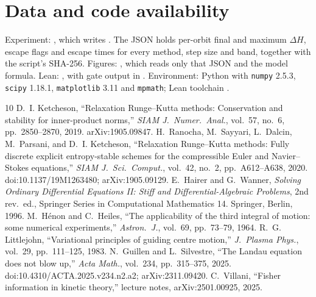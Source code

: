 \documentclass[11pt,a4paper]{article}
\theoremstyle{definition}
\begin{document}
\section*{Data and code availability}
Experiment: , which writes . The JSON holds per-orbit final and maximum $\Delta H$, escape flags and escape times for every method, step size and band, together with the script's SHA-256. Figures: , which reads only that JSON and the model formula. Lean: , with gate output in . Environment: Python with \texttt{numpy} 2.5.3, \texttt{scipy} 1.18.1, \texttt{matplotlib} 3.11 and \texttt{mpmath}; Lean toolchain .

\begin{thebibliography}{10}
 D.~I. Ketcheson, ``Relaxation Runge--Kutta methods: Conservation and stability for inner-product norms,'' \emph{SIAM J.\ Numer.\ Anal.}, vol.~57, no.~6, pp.~2850--2870, 2019. arXiv:1905.09847.
 H.~Ranocha, M.~Sayyari, L.~Dalcin, M.~Parsani, and D.~I. Ketcheson, ``Relaxation Runge--Kutta methods: Fully discrete explicit entropy-stable schemes for the compressible Euler and Navier--Stokes equations,'' \emph{SIAM J.\ Sci.\ Comput.}, vol.~42, no.~2, pp.~A612--A638, 2020. doi:10.1137/19M1263480; arXiv:1905.09129.
 E.~Hairer and G.~Wanner, \emph{Solving Ordinary Differential Equations II: Stiff and Differential-Algebraic Problems}, 2nd rev.\ ed., Springer Series in Computational Mathematics 14. Springer, Berlin, 1996.
 M.~H\'enon and C.~Heiles, ``The applicability of the third integral of motion: some numerical experiments,'' \emph{Astron.\ J.}, vol.~69, pp.~73--79, 1964.
 R.~G. Littlejohn, ``Variational principles of guiding centre motion,'' \emph{J.\ Plasma Phys.}, vol.~29, pp.~111--125, 1983.
 N.~Guillen and L.~Silvestre, ``The Landau equation does not blow up,'' \emph{Acta Math.}, vol.~234, pp.~315--375, 2025. doi:10.4310/ACTA.2025.v234.n2.a2; arXiv:2311.09420.
 C.~Villani, ``Fisher information in kinetic theory,'' lecture notes, arXiv:2501.00925, 2025.
\end{thebibliography}
\end{document}

